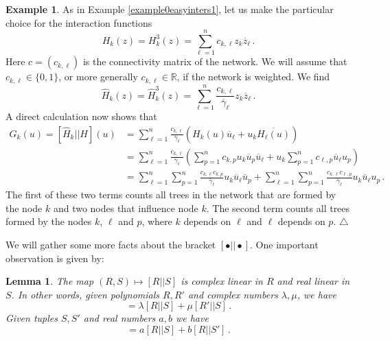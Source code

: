 \documentclass[12pt]{article}
\theoremstyle{plain}
\newtheorem{lem}[thr]{Lemma}
\theoremstyle{definition}
\newtheorem{ex}[thr]{Example}
\theoremstyle{remark}
\theoremstyle{remark}
\begin{document}
\begin{ex}\label{examzi11}
As in Example \ref{example0easyinters1}, let us make the particular choice for the interaction functions
\begin{equation}
H_k(z) = {H}_k^3(z) = \sum_{\ell = 1}^nc_{k,\ell}z_k\overline{z}_{\ell}\, .
\end{equation}
Here $c = (c_{k,\ell})$ is the connectivity matrix of the network. We will assume that $c_{k,\ell} \in \{0,1\}$, or more generally $c_{k,\ell} \in \mathbb{R}$, if the network is weighted.  We find
\begin{equation}
\widehat{H}_{k}(z) = \widehat{H}^3_{k}(z) =  \sum_{\ell = 1}^n\frac{c_{k,\ell}}{\overline{\gamma}_{\ell}}z_k\overline{z}_{\ell} \, .
\end{equation}
A direct calculation now shows that
\begin{align}
G_k(u) = [\widehat{H}_{k}|| H](u) &= \sum_{\ell= 1}^n\frac{c_{k,\ell}}{\overline{\gamma}_{\ell}}(H_k(u)\overline{u}_{\ell} + u_k\overline{H_\ell(u)}) \\ \nonumber
&= \sum_{\ell = 1}^n\frac{c_{k, \ell}}{\overline{\gamma}_{\ell}}\left(\sum_{p = 1}^n c_{k,p} u_k \overline{u}_p\overline{u}_{\ell} + u_k\sum_{p=1}^nc_{\ell,p}\overline{u}_{\ell}u_p\right) \\ \nonumber
&= \sum_{\ell = 1}^n \sum_{p = 1}^n\frac{c_{k,\ell}c_{k,p}}{\overline{\gamma}_{\ell}} u_k \overline{u}_{\ell}\overline{u}_p + \sum_{\ell = 1}^n \sum_{p = 1}^n\frac{c_{k,\ell}c_{\ell,p}}{\overline{\gamma}_\ell} u_k\overline{u}_{\ell}u_p \, .
\end{align}
The first of these two terms counts all trees in the network that are formed by the node $k$ and two nodes that influence node $k$. The second term counts all trees formed by the nodes $k$, $\ell$ and $p$, where $k$ depends on $\ell$ and $\ell$ depends on $p$.  \hfill $\triangle$
\end{ex}

We will gather some more facts about the bracket $[\bullet || \bullet]$. One important observation is given by:

\begin{lem}\label{useful0}
The map $(R,S) \mapsto [R||S]$ is complex linear in $R$ and real linear in $S$. In other words, given polynomials $R, R'$ and complex numbers $\lambda, \mu$, we have
\begin{equation}
    [\lambda R + \mu R'||S] = \lambda [R||S] + \mu [R'||S] \, .
\end{equation}
Given tuples $S, S'$ and real numbers $a,b$ we have
\begin{equation}
    [R||aS + bS'] = a [R||S] + b [R||S'] \, .
\end{equation}
\end{lem}
\end{document}
